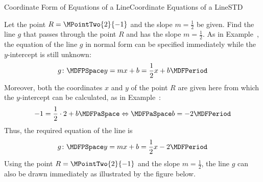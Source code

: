 \begin{MXContent}{Coordinate Form of Equations of a Line}{Coordinate Equations of a Line}{STD}
\begin{MExample}
Let the point $R=\MPointTwo{2}{-1}$ and the slope $m=\frac{1}{2}$ be given. Find the line $g$ that passes through the point $R$ and has the slope 
$m=\frac{1}{2}$. As in Example~, the equation of the line $g$ in normal form can be specified immediately while the 
$y$-intercept is still unknown:
\[
 g\colon\MDFPSpace y=m x+b=\frac{1}{2}x+b\MDFPeriod
\]
Moreover, both the coordinates $x$ and $y$ of the point $R$ are given here from which the $y$-intercept can be calculated, as 
in Example~:
\[
 -1=\frac{1}{2}\cdot 2 + b\MDFPaSpace\Leftrightarrow\MDFPaSpace b=-2\MDFPeriod
\]
Thus, the required equation of the line is
\[
 g\colon\MDFPSpace y=m x+b=\frac{1}{2}x-2\MDFPeriod
\]
Using the point $R=\MPointTwo{2}{-1}$ and the slope $m=\frac{1}{2}$, the line $g$ can also be drawn immediately as illustrated by the 
figure below.
  \begin{center}
\end{center} 
\end{MExample}


\end{MXContent}
